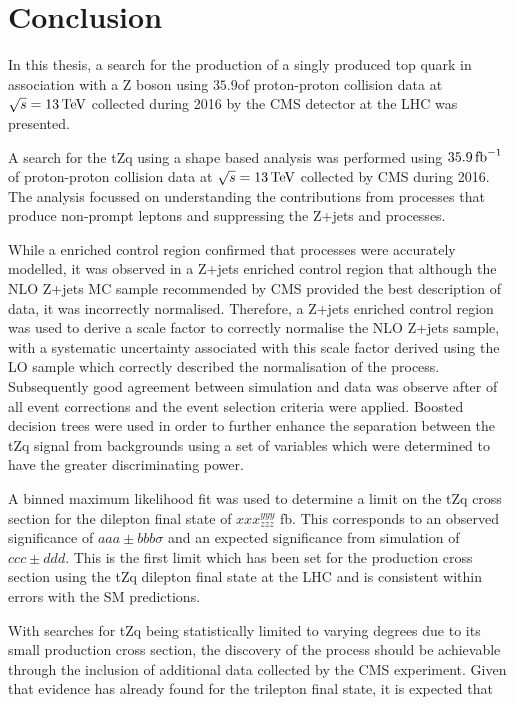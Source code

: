 \chapter{Conclusion}\label{chapter:conclusion}
In this thesis, a search for the production of a singly produced top quark in association with a Z boson using $35.9$\fbinv of proton-proton collision data at $\sqrt{s} = 13\,\text{Te\hspace{-.08em}V}$ collected during 2016 by the CMS detector at the LHC was presented.

A search for the tZq using a shape based analysis was performed using $35.9\mbox{\ensuremath{\,\text{fb}^\text{$-$1}}}$ of proton-proton collision data at $\sqrt{s} = 13\,\text{Te\hspace{-.08em}V}$ collected by CMS during 2016.
The analysis focussed on understanding the contributions from processes that produce non-prompt leptons and suppressing the Z+jets and \ttbar processes.

While a \ttbar enriched control region confirmed that \ttbar processes were accurately modelled, it was observed in a Z+jets enriched control region that although the NLO Z+jets MC sample recommended by CMS provided the best description of data, it was incorrectly normalised.
Therefore, a Z+jets enriched control region was used to derive a scale factor to correctly normalise the NLO Z+jets sample, with a systematic uncertainty associated with this scale factor derived using the LO sample which correctly described the normalisation of the process.
Subsequently good agreement between simulation and data was observe after of all event corrections and the event selection criteria were applied. 
Boosted decision trees were used in order to further enhance the separation between the tZq signal from backgrounds using a set of variables which were determined to have the greater discriminating power.

A binned maximum likelihood fit was used to determine a limit on the tZq cross section for the dilepton final state of $xxx^{yyy}_{zzz}$ fb.
This corresponds to an observed significance of $aaa \pm bbb \sigma$ and an expected significance from simulation of $ccc \pm ddd$. 
This is the first limit which has been set for the production cross section using the tZq dilepton final state at the LHC and is consistent within errors with the SM predictions.

With searches for tZq being statistically limited to varying degrees due to its small production cross section, the discovery of the process should be achievable through the inclusion of additional data collected by the CMS experiment.
Given that evidence has already found for the trilepton final state, it is expected that 

